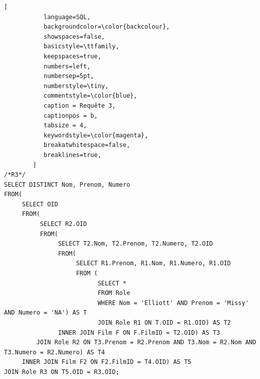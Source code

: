 \documentclass[10pt,a4paper]{article}
\begin{document}
\begin{lstlisting}[
           language=SQL,
           backgroundcolor=\color{backcolour},
           showspaces=false,
           basicstyle=\ttfamily,
           keepspaces=true,                 
           numbers=left,                    
           numbersep=5pt,
           numberstyle=\tiny,
           commentstyle=\color{blue},
           caption = Requête 3,
           captionpos = b,
           tabsize = 4,
           keywordstyle=\color{magenta},
           breakatwhitespace=false,         
           breaklines=true,
        ]
/*R3*/
SELECT DISTINCT Nom, Prenom, Numero
FROM(
     SELECT OID
     FROM(
          SELECT R2.OID
          FROM(
               SELECT T2.Nom, T2.Prenom, T2.Numero, T2.OID
               FROM(
               		SELECT R1.Prenom, R1.Nom, R1.Numero, R1.OID
                    FROM (
                    	  SELECT *
                          FROM Role
                          WHERE Nom = 'Elliott' AND Prenom = 'Missy' AND Numero = 'NA') AS T
                          JOIN Role R1 ON T.OID = R1.OID) AS T2
               INNER JOIN Film F ON F.FilmID = T2.OID) AS T3
         JOIN Role R2 ON T3.Prenom = R2.Prenom AND T3.Nom = R2.Nom AND T3.Numero = R2.Numero) AS T4
     INNER JOIN Film F2 ON F2.FilmID = T4.OID) AS T5
JOIN Role R3 ON T5.OID = R3.OID;
\end{lstlisting}
\end{document}
